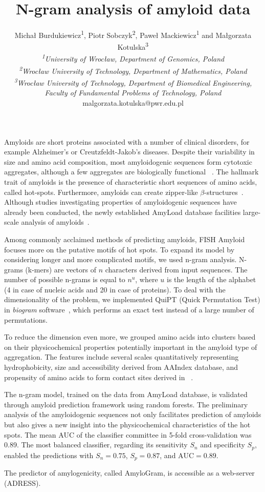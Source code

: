 \documentclass[english]{gcb15abstract}
\title{N-gram analysis of amyloid data}
\author{
Micha\l{} Burdukiewicz\textsuperscript{1}, Piotr Sobczyk\textsuperscript{2}, Pawe\l{} Mackiewicz\textsuperscript{1} and Ma\l{}gorzata Kotulska\textsuperscript{3} \\
\small{
{\normalfont\itshape \textsuperscript{1}University of Wroc\l{}aw, Department of Genomics, Poland}\\
{\normalfont\itshape \textsuperscript{2}Wroc\l{}aw University of Technology, Department of Mathematics, Poland}\\
{\normalfont\itshape \textsuperscript{3}Wroc\l{}aw University of Technology, Department of Biomedical Engineering, Faculty of Fundamental Problems of Technology, Poland}\\
malgorzata.kotulska@pwr.edu.pl
}
}
\begin{document}
\maketitle 

Amyloids are short proteins associated with a number of clinical disorders, for example Alzheimer's or Creutzfeldt-Jakob's diseases. Despite their variability in size and amino acid composition, most amyloidogenic sequences form cytotoxic aggregates, although a few aggregates are biologically functional ~\cite{breydo_structural_2015}. The hallmark trait of amyloids is the presence of characteristic short sequences of amino acids, called hot-spots. Furthermore, amyloids can create zipper\mbox{-}\nobreak\hspace{0pt}like $\beta$\mbox{-}\nobreak\hspace{0pt}structures~\cite{fandrich_oligomeric_2012}. Although studies investigating properties of amyloidogenic sequences have already been conducted, the newly established AmyLoad database facilities large-scale analysis of amyloids~\cite{wozniak_amyload:_2015}.

Among commonly acclaimed methods of predicting amyloids, FISH Amyloid~\cite{gasior_fish_2014} focuses more on the putative motifs of hot spots. To expand its model by considering longer and more complicated motifs, we used n-gram analysis. N-grams (k-mers) are vectors of $n$ characters derived from input sequences. The number of possible n-grams is equal to $n^u$, where $u$ is the length of the alphabet (4 in case of nucleic acids and 20 in case of proteins). To deal with the dimensionality of the problem, we implemented QuiPT (Quick Permutation Test) in \textit{biogram} software~\cite{burdukiewicz_biogram:_2015}, which performs an exact test instead of a large number of permutations. 

To reduce the dimension even more, we grouped amino acids into clusters based on their physicochemical properties potentially important in the amyloid type of aggregation. The features include several scales quantitatively representing hydrophobicity, size and accessibility derived from AAIndex database, and propensity of amino acids to form contact sites derived in ~\cite{wozniak_characteristics_2014}.

The n-gram model, trained on the data from AmyLoad database, is validated through amyloid prediction framework using random forests. The preliminary analysis of the amyloidogenic sequences not only facilitates prediction of amyloids but also gives a new insight into the physicochemical characteristics of the hot spots. The mean AUC of the classifier committee in 5-fold cross-validation was 0.89. The most balanced classifier, regarding its sensitivity $S_n$ and specificity $S_p$, enabled the predictions with $S_n=0.75$, $S_p=0.87$, and $\textrm{AUC}=0.89$. 

The predictor of amylogenicity, called AmyloGram, is accessible as a web-server (ADRESS).

\scriptsize{

}
\end{document}
